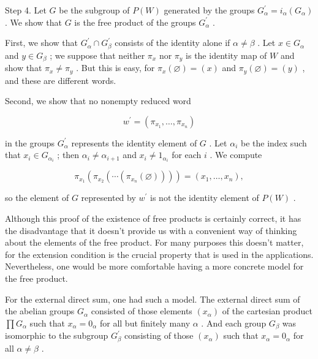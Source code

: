 \documentclass[10pt]{article}
\begin{document}
Step 4. Let \(G\) be the subgroup of \(P\left( W\right)\) generated by the groups \({G}_{\alpha }^{\prime } = {i}_{\alpha }\left( {G}_{\alpha }\right)\) . We show that \(G\) is the free product of the groups \({G}_{\alpha }^{\prime }\) .

First, we show that \({G}_{\alpha }^{\prime } \cap  {G}_{\beta }^{\prime }\) consists of the identity alone if \(\alpha  \neq  \beta\) . Let \(x \in  {G}_{\alpha }\) and \(y \in  {G}_{\beta }\) ; we suppose that neither \({\pi }_{x}\) nor \({\pi }_{y}\) is the identity map of \(W\) and show that \({\pi }_{x} \neq  {\pi }_{y}\) . But this is easy, for \({\pi }_{x}\left( \varnothing \right)  = \left( x\right)\) and \({\pi }_{y}\left( \varnothing \right)  = \left( y\right)\) , and these are different words.

Second, we show that no nonempty reduced word

\[
{w}^{\prime } = \left( {{\pi }_{{x}_{1}},\ldots ,{\pi }_{{x}_{n}}}\right)
\]

in the groups \({G}_{\alpha }^{\prime }\) represents the identity element of \(G\) . Let \({\alpha }_{i}\) be the index such that \({x}_{i} \in  {G}_{{\alpha }_{i}}\) ; then \({\alpha }_{i} \neq  {\alpha }_{i + 1}\) and \({x}_{i} \neq  {1}_{{\alpha }_{i}}\) for each \(i\) . We compute

\[
{\pi }_{{x}_{1}}\left( {{\pi }_{{x}_{2}}\left( {\cdots \left( {{\pi }_{{x}_{n}}\left( \varnothing \right) }\right) }\right) }\right)  = \left( {{x}_{1},\ldots ,{x}_{n}}\right) ,
\]

so the element of \(G\) represented by \({w}^{\prime }\) is not the identity element of \(P\left( W\right)\) .

Although this proof of the existence of free products is certainly correct, it has the disadvantage that it doesn't provide us with a convenient way of thinking about the elements of the free product. For many purposes this doesn't matter, for the extension condition is the crucial property that is used in the applications. Nevertheless, one would be more comfortable having a more concrete model for the free product.

For the external direct sum, one had such a model. The external direct sum of the abelian groups \({G}_{\alpha }\) consisted of those elements \(\left( {x}_{\alpha }\right)\) of the cartesian product \(\prod {G}_{\alpha }\) such that \({x}_{\alpha } = {0}_{\alpha }\) for all but finitely many \(\alpha\) . And each group \({G}_{\beta }\) was isomorphic to the subgroup \({G}_{\beta }^{\prime }\) consisting of those \(\left( {x}_{\alpha }\right)\) such that \({x}_{\alpha } = {0}_{\alpha }\) for all \(\alpha  \neq  \beta\) .
\end{document}
